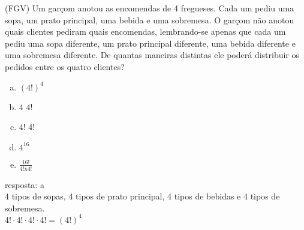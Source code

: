 \begin{ex}
 (FGV) Um garçom anotou as encomendas de 4 fregueses. Cada um pediu uma sopa, um prato principal, uma bebida e uma sobremesa. O garçom não anotou quais clientes pediram quais encomendas, lembrando-se apenas que cada um pediu uma sopa diferente, um prato principal diferente, uma bebida diferente e uma sobremesa diferente. De quantas maneiras distintas ele poderá distribuir os pedidos entre os quatro clientes? 
    \begin{enumerate}[(a)]
    \item $(4!)^4$
    \item 4  4!
    \item 4!  4!
    \item $4^{16}$
    \item $\frac{16!}{4! \text{x} 4!}$
    \end{enumerate}
      \begin{sol}
       resposta: a \\
       4 tipos de sopas, 4 tipos de prato principal, 4 tipos de bebidas e 4 tipos de sobremesa.\\
       $4!\cdot4!\cdot4!\cdot4! = (4!)^4$
      \end{sol}
\end{ex}